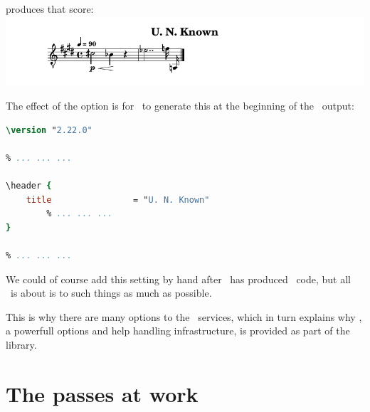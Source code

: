 produces that score:\\
\includegraphics[scale=0.7]{../graphics/MinimalScoreWithAnotherTitle.png}

The effect of the  option is for \xmlToLy\ to generate this at the beginning of the \lily\ output:
\begin{lstlisting}[language=Lilypond]
\version "2.22.0"

% ... ... ...

\header {
    title                = "U. N. Known"
		% ... ... ...
}

% ... ... ...
\end{lstlisting}

We could of course add this  setting by hand after \xmlToLy\ has produced \lily\ code, but all \mf\ is about is to  such things as much as possible.

This is why there are  many options to the \mf\ services, which in turn explains why \oahRepr, a powerfull options and help handling infrastructure, is provided as part of the library.


\section{The passes at work}

